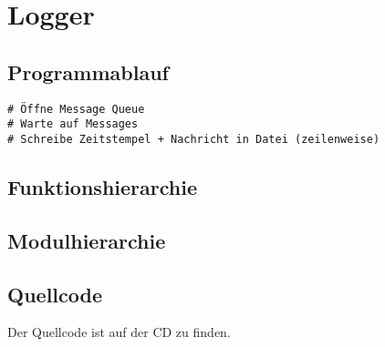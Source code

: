 \section{Logger}

\subsection{Programmablauf}
\begin{lstlisting}
# Öffne Message Queue
# Warte auf Messages
# Schreibe Zeitstempel + Nachricht in Datei (zeilenweise)
\end{lstlisting}

\subsection{Funktionshierarchie}

\subsection{Modulhierarchie}

\subsection{Quellcode}
Der Quellcode ist auf der CD zu finden.